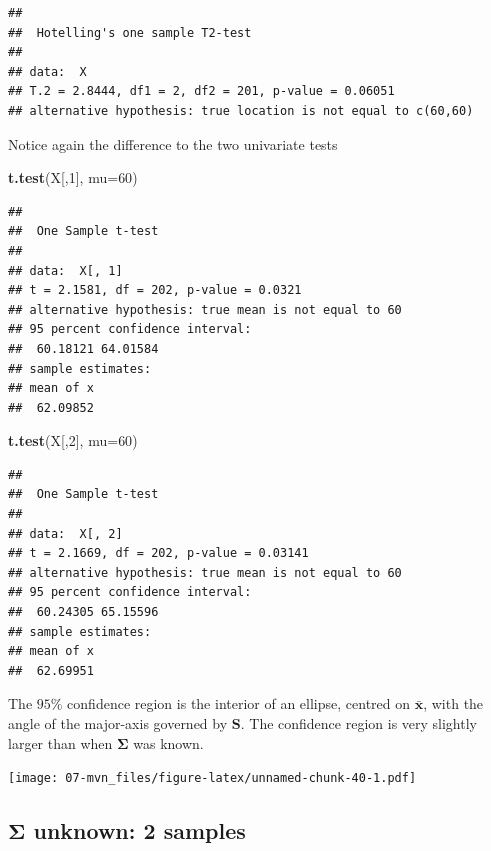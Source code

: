 \documentclass[]{book}
\newenvironment{Shaded}{\begin{snugshade}}{\end{snugshade}}
\newcommand{\DataTypeTok}[1]{\textcolor[rgb]{0.13,0.29,0.53}{#1}}
\newcommand{\DecValTok}[1]{\textcolor[rgb]{0.00,0.00,0.81}{#1}}
\newcommand{\KeywordTok}[1]{\textcolor[rgb]{0.13,0.29,0.53}{\textbf{#1}}}
\newcommand{\NormalTok}[1]{#1}
\theoremstyle{definition}
\theoremstyle{definition}
\theoremstyle{definition}
\theoremstyle{remark}
\begin{document}
\begin{verbatim}
## 
##  Hotelling's one sample T2-test
## 
## data:  X
## T.2 = 2.8444, df1 = 2, df2 = 201, p-value = 0.06051
## alternative hypothesis: true location is not equal to c(60,60)
\end{verbatim}

Notice again the difference to the two univariate tests

\begin{Shaded}
\begin{Highlighting}[]
\KeywordTok{t.test}\NormalTok{(X[,}\DecValTok{1}\NormalTok{], }\DataTypeTok{mu=}\DecValTok{60}\NormalTok{)}
\end{Highlighting}
\end{Shaded}

\begin{verbatim}
## 
##  One Sample t-test
## 
## data:  X[, 1]
## t = 2.1581, df = 202, p-value = 0.0321
## alternative hypothesis: true mean is not equal to 60
## 95 percent confidence interval:
##  60.18121 64.01584
## sample estimates:
## mean of x 
##  62.09852
\end{verbatim}

\begin{Shaded}
\begin{Highlighting}[]
\KeywordTok{t.test}\NormalTok{(X[,}\DecValTok{2}\NormalTok{], }\DataTypeTok{mu=}\DecValTok{60}\NormalTok{)}
\end{Highlighting}
\end{Shaded}

\begin{verbatim}
## 
##  One Sample t-test
## 
## data:  X[, 2]
## t = 2.1669, df = 202, p-value = 0.03141
## alternative hypothesis: true mean is not equal to 60
## 95 percent confidence interval:
##  60.24305 65.15596
## sample estimates:
## mean of x 
##  62.69951
\end{verbatim}

The \(95\)\% confidence region is the interior of an ellipse, centred on \(\bar{\mathbf x}\), with the angle of the major-axis governed by \(\mathbf S\). The confidence region is very slightly larger than when \(\boldsymbol{\Sigma}\) was known.

\texttt{[image: 07-mvn\_files/figure-latex/unnamed-chunk-40-1.pdf]}

\hypertarget{boldsymbolsigma-unknown-2-samples}{%
\subsection{\texorpdfstring{\(\boldsymbol{\Sigma}\) unknown: 2 samples}{\textbackslash{}boldsymbol\{\textbackslash{}Sigma\} unknown: 2 samples}}\label{boldsymbolsigma-unknown-2-samples}}
\end{document}
